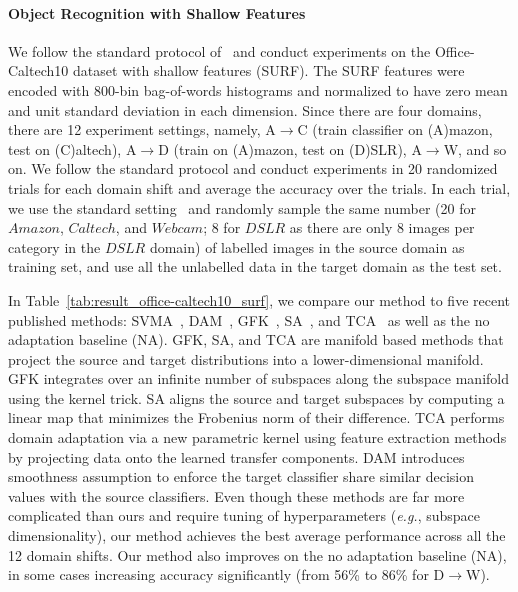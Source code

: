 \documentclass[graybox]{svmult}
\newcommand\eg{\emph{e.g.}}
\begin{document}
\paragraph{\textbf{Object Recognition with Shallow Features}}
We follow the standard protocol of~\cite{gfk,sa,gopalan-iccv11,ref:kulis_cvpr11,saenko2010adapting} and conduct experiments on the Office-Caltech10 dataset with shallow features (SURF).
The SURF features were encoded with 800-bin bag-of-words histograms and normalized to have zero mean and unit standard deviation in each dimension.  Since there are four domains, there are 12 experiment settings, namely, A$\rightarrow$C (train classifier on (A)mazon, test on (C)altech), A$\rightarrow$D (train on (A)mazon, test on (D)SLR), A$\rightarrow$W, and so on. We follow the standard protocol and conduct experiments in 20 randomized trials for each domain shift and average the accuracy over the trials. In each trial, we use the standard setting~\cite{gfk,sa,gopalan-iccv11,ref:kulis_cvpr11,saenko2010adapting} and randomly sample the same number (20 for $Amazon$, $Caltech$, and $Webcam$; 8 for $DSLR$ as there are only 8 images per category in the $DSLR$ domain) of labelled images in the source domain as training set, and use all the unlabelled data in the target domain as the test set. 

In Table~\ref{tab:result_office-caltech10_surf}, we compare our method to five recent published methods: SVMA~\cite{svma}, DAM~\cite{ref:duan09}, GFK~\cite{gfk}, SA~\cite{sa}, and TCA~\cite{tca} as well as the no adaptation baseline (NA). GFK, SA, and TCA are manifold based methods that project the source and target distributions into a lower-dimensional manifold. GFK integrates over an infinite number of subspaces along the subspace manifold using the kernel trick. SA aligns the source and target subspaces by computing a linear map that minimizes the Frobenius norm of their difference. TCA performs domain adaptation via a new parametric kernel using feature extraction methods by projecting data onto the learned transfer components. DAM introduces smoothness assumption to enforce the target classifier share similar decision values with the source classifiers. Even though these methods are far more complicated than ours and require tuning of hyperparameters (\eg, subspace dimensionality), our method achieves the best average performance across all the 12 domain shifts. Our method also improves on the no adaptation baseline (NA), in some cases increasing accuracy significantly (from 56\% to 86\% for D$\rightarrow$W).
\end{document}
